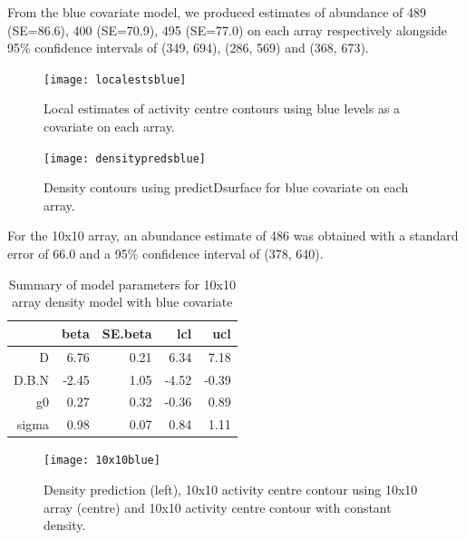 \documentclass[a4paper,12pt]{article}
\begin{document}
From the blue covariate model, we produced estimates of abundance of 489 (SE=86.6), 400 (SE=70.9), 495 (SE=77.0) on each array respectively alongside 95\% confidence intervals of (349, 694), (286, 569) and (368, 673).

\begin{figure}[H]
\centering
\texttt{[image: localestsblue]}
\caption{Local estimates of activity centre contours using blue levels as a covariate on each array.}
\label{localestsblue}
\end{figure}

\begin{figure}[H]
\centering
\texttt{[image: densitypredsblue]}
\caption{Density contours using predictDsurface for blue covariate on each array.}
\label{densitypredblue}
\end{figure}

For the 10x10 array, an abundance estimate of 486 was obtained with a standard error of 66.0 and a 95\% confidence interval of (378, 640).

\begin{table}[ht]
\centering
\begin{tabular}{rrrrr}
  \hline
 & beta & SE.beta & lcl & ucl \\ 
  \hline
D & 6.76 & 0.21 & 6.34 & 7.18 \\ 
  D.B.N & -2.45 & 1.05 & -4.52 & -0.39 \\ 
  g0 & 0.27 & 0.32 & -0.36 & 0.89 \\ 
  sigma & 0.98 & 0.07 & 0.84 & 1.11 \\ 
   \hline
\end{tabular}
\caption{Summary of model parameters for 10x10 array density model with blue covariate}
\end{table}

\begin{figure}[H]
\centering
\texttt{[image: 10x10blue]}
\caption{Density prediction (left), 10x10 activity centre contour using 10x10 array (centre) and 10x10 activity centre contour with constant density.}
\label{10x10blue}
\end{figure}


\end{document}
